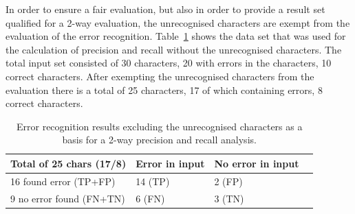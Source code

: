 In order to ensure a fair evaluation, but also in order to provide 
a result set qualified for a 2-way evaluation, the unrecognised characters are 
exempt from the evaluation of the error recognition.
Table~\ref{table:eval:resultsprecisionandrecallnumbersunrecognisedexempt}
shows the data set that was used for the calculation of precision and recall
without the unrecognised characters. The total input set consisted of 30 characters, 20 with errors in the characters, 10 correct characters.
After exempting the unrecognised characters from the evaluation there is a total
of 25 characters, 17 of which containing errors, 8 correct characters.
\begin{table}[htbp]
\begin{center}
  \begin{tabular}{|l|l|l|p{200pt}|}
    \hline
    Total of 25 chars (17/8)  & Error in input      & No error in input \\
    \hline
    16 found error (TP+FP)    & 14 (TP)             & 2 (FP) \\
    \hline
    9 no error found (FN+TN)  & 6 (FN)              & 3 (TN) \\
    \hline
  \end{tabular}
\end{center}
\caption{Error recognition results excluding the unrecognised characters as a
basis for a 2-way precision and recall analysis.}
\label{table:eval:resultsprecisionandrecallnumbersunrecognisedexempt}
\end{table}


